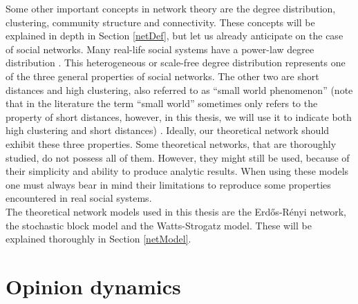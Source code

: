 \documentclass[11 pt , letterpaper , twoside , openright]{book}
\begin{document}
\newline
Some other important concepts in network theory are the degree distribution, clustering, community structure and connectivity. These concepts will be explained in depth in Section \ref{netDef}, but let us already anticipate on the case of social networks. Many real-life social systems have a power-law degree distribution \cite{Muchnik2013}. This heterogeneous or scale-free degree distribution represents one of the three general properties of social networks. The other two are short distances and high clustering, also referred to as ``small world phenomenon'' (note that in the literature the term ``small world'' sometimes only refers to the property of short distances, however, in this thesis, we will use it to indicate both high clustering and short distances) \cite{Muchnik2013}. Ideally, our theoretical network should exhibit these three properties. Some theoretical networks, that are thoroughly studied, do not possess all of them. However, they might still be used, because of their simplicity and ability to produce analytic results. When using these models one must always bear in mind their limitations to reproduce some properties encountered in real social systems. \\
\newline
The theoretical network models used in this thesis are the Erd\H{o}s-R\'{e}nyi network, the stochastic block model and the Watts-Strogatz model. These will be explained thoroughly in Section \ref{netModel}. 

\section{Opinion dynamics}\label{Opinion}
\end{document}
